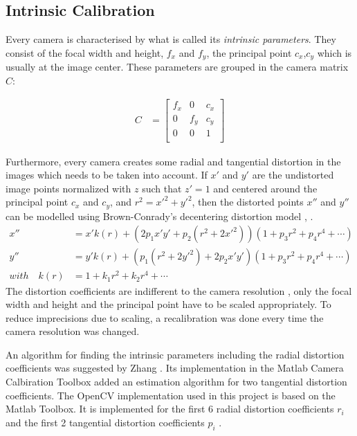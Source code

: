 
\subsection{Intrinsic Calibration}
\label{sec:intrinsic}

Every camera is characterised by what is called its \textit{intrinsic parameters}. They consist of the focal width and height, $f_x$ and $f_y$, the principal point $c_x$,$c_y$ which is usually at the image center. These parameters are grouped in the camera matrix $C$:

\begin{align}
    C &= \begin{bmatrix}
        f_x & 0 & c_x \\
        0 & f_y & c_y \\
        0 & 0 & 1 \\
    \end{bmatrix} 
\end{align}

Furthermore, every camera creates some radial and tangential distortion in the images which needs to be taken into account. 
If $x'$ and $y'$ are the undistorted image points normalized with $z$ such that $z'=1$ and centered around the principal point $c_x$ and $c_y$, and $r^2=x'^2+y'^2$,
then the distorted points $x''$ and $y''$ can be modelled using Brown-Conrady's decentering distortion model \cite{Brown1966}, \cite{Conrady1919}. 
\begin{align}
    x'' &= x' k(r) + (2p_1 x' y' + p_2(r^2 + 2x'^2))(1+p_3r^2+p_4r^4 + \cdots) \\
    y'' &= y' k(r) + (p_1(r^2+2y'^2) + 2p_2x'y')(1+p_3r^2+p_4r^4 + \cdots) \\
    with \quad k(r) &= 1+k_1r^2+k_2r^4 + \cdots
\end{align}
The distortion coefficients are indifferent to the camera resolution \cite{calib3d}, only the focal width and height and the principal point have to be scaled appropriately. To reduce imprecisions due to scaling, a recalibration was done every time the camera resolution was changed.

An algorithm for finding the intrinsic parameters including the radial distortion coefficients was suggested by Zhang \cite{Zhang2000}. 
Its implementation in the Matlab Camera Calbiration Toolbox added an estimation algorithm for two tangential distortion coefficients. \cite{MTB}
The OpenCV implementation used in this project is based on the Matlab Toolbox. It is implemented for the first 6 radial distortion coefficients $r_i$ and the first 2 tangential distortion coefficients $p_i$ \cite{calib3d}.


